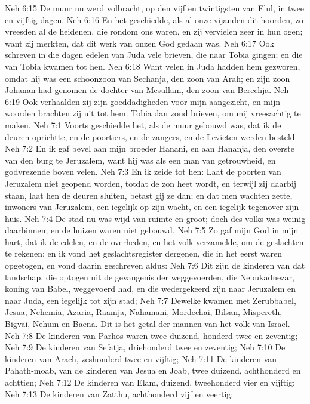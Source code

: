 Neh 6:15  De muur nu werd volbracht, op den vijf en twintigsten van Elul, in twee en vijftig dagen.
Neh 6:16  En het geschiedde, als al onze vijanden dit hoorden, zo vreesden al de heidenen, die rondom ons waren, en zij vervielen zeer in hun ogen; want zij merkten, dat dit werk van onzen God gedaan was.
Neh 6:17  Ook schreven in die dagen edelen van Juda vele brieven, die naar Tobia gingen; en die van Tobia kwamen tot hen.
Neh 6:18  Want velen in Juda hadden hem gezworen, omdat hij was een schoonzoon van Sechanja, den zoon van Arah; en zijn zoon Johanan had genomen de dochter van Mesullam, den zoon van Berechja.
Neh 6:19  Ook verhaalden zij zijn goeddadigheden voor mijn aangezicht, en mijn woorden brachten zij uit tot hem. Tobia dan zond brieven, om mij vreesachtig te maken.
Neh 7:1  Voorts geschiedde het, als de muur gebouwd was, dat ik de deuren oprichtte, en de poortiers, en de zangers, en de Levieten werden besteld.
Neh 7:2  En ik gaf bevel aan mijn broeder Hanani, en aan Hananja, den overste van den burg te Jeruzalem, want hij was als een man van getrouwheid, en godvrezende boven velen.
Neh 7:3  En ik zeide tot hen: Laat de poorten van Jeruzalem niet geopend worden, totdat de zon heet wordt, en terwijl zij daarbij staan, laat hen de deuren sluiten, betast gij ze dan; en dat men wachten zette, inwoners van Jeruzalem, een iegelijk op zijn wacht, en een iegelijk tegenover zijn huis.
Neh 7:4  De stad nu was wijd van ruimte en groot; doch des volks was weinig daarbinnen; en de huizen waren niet gebouwd.
Neh 7:5  Zo gaf mijn God in mijn hart, dat ik de edelen, en de overheden, en het volk verzamelde, om de geslachten te rekenen; en ik vond het geslachtsregister dergenen, die in het eerst waren opgetogen, en vond daarin geschreven aldus:
Neh 7:6  Dit zijn de kinderen van dat landschap, die optogen uit de gevangenis der weggevoerden, die Nebukadnezar, koning van Babel, weggevoerd had, en die wedergekeerd zijn naar Jeruzalem en naar Juda, een iegelijk tot zijn stad;
Neh 7:7  Dewelke kwamen met Zerubbabel, Jesua, Nehemia, Azaria, Raamja, Nahamani, Mordechai, Bilsan, Mispereth, Bigvai, Nehum en Baena. Dit is het getal der mannen van het volk van Israel.
Neh 7:8  De kinderen van Parhos waren twee duizend, honderd twee en zeventig;
Neh 7:9  De kinderen van Sefatja, driehonderd twee en zeventig;
Neh 7:10  De kinderen van Arach, zeshonderd twee en vijftig;
Neh 7:11  De kinderen van Pahath-moab, van de kinderen van Jesua en Joab, twee duizend, achthonderd en achttien;
Neh 7:12  De kinderen van Elam, duizend, tweehonderd vier en vijftig;
Neh 7:13  De kinderen van Zatthu, achthonderd vijf en veertig;
